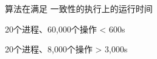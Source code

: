 \begin{frame}{}
  {\readcentric{} 算法在满足 \PRAM{} 一致性的执行上的运行时间}

  \vspace{-0.30cm}

  \begin{description}
    \centering
    \item[\readcentric{}:] 20个进程、60,000个操作 < 600s~\footnotemark[1]~
    \item[\rwclosure{}:] 20个进程、8,000个操作 > 3,000s
  \end{description}
\end{frame}
